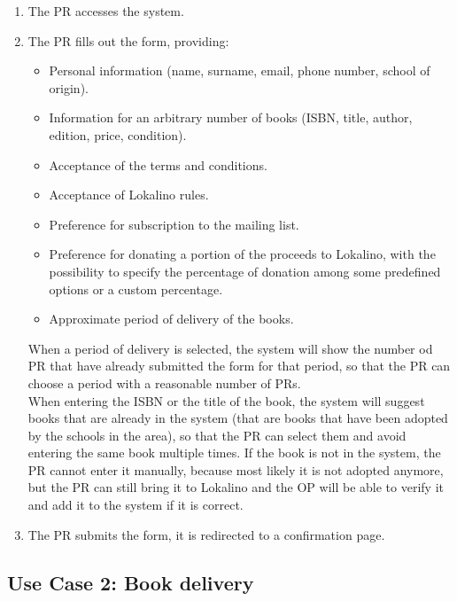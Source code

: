 \begin{enumerate}
    \item The PR accesses the system.
    \item The PR fills out the form, providing:
          \begin{itemize}
              \item Personal information (name, surname, email, phone number, school of origin).
              \item Information for an arbitrary number of books (ISBN, title, author, edition, price, condition).
              \item Acceptance of the terms and conditions.
              \item Acceptance of Lokalino rules.
              \item Preference for subscription to the mailing list.
              \item Preference for donating a portion of the proceeds to Lokalino, with the possibility to specify the percentage of donation among some predefined options or a custom percentage.
              \item Approximate period of delivery of the books.
          \end{itemize}
          When a period of delivery is selected, the system will show the number od PR that have already submitted the form for that period, so that the PR can choose a period with a reasonable number of PRs.\\
          When entering the ISBN or the title of the book, the system will suggest books that are already in the system (that are books that have been adopted by the schools in the area), so that the PR can select them and avoid entering the same book multiple times. If the book is not in the system, the PR cannot enter it manually, because most likely it is not adopted anymore, but the PR can still bring it to Lokalino and the OP will be able to verify it and add it to the system if it is correct.
    \item The PR submits the form, it is redirected to a confirmation page.
\end{enumerate}

\subsection{Use Case 2: Book delivery}

